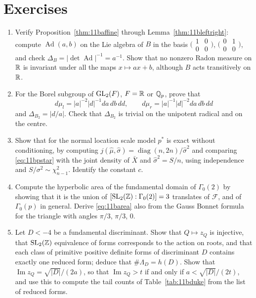 \section{Exercises}

\begin{enumerate}
\item Verify Proposition~\ref{thm:11baffine} through Lemma~\ref{thm:11bleftright}: compute $\operatorname{Ad}(a,b)$ on the Lie algebra of $B$ in the basis $\bigl(\begin{smallmatrix}1&0\\0&0\end{smallmatrix}\bigr)$, $\bigl(\begin{smallmatrix}0&1\\0&0\end{smallmatrix}\bigr)$, and check $\Delta_B=|\det\operatorname{Ad}|^{-1}=a^{-1}$. Show that no nonzero Radon measure on $\mathbb{R}$ is invariant under all the maps $x\mapsto ax+b$, although $B$ acts transitively on $\mathbb{R}$.
\item\label{ex:11bborel} For the Borel subgroup of $\mathrm{GL}_2(F)$, $F=\mathbb{R}$ or $\mathbb{Q}_p$, prove that
\[d\mu_l=|a|^{-2}|d|^{-1}da\,db\,dd,\qquad d\mu_r=|a|^{-1}|d|^{-2}da\,db\,dd\]
and $\Delta_{B_2}=|d/a|$. Check that $\Delta_{B_2}$ is trivial on the unipotent radical and on the centre.
\item Show that for the normal location scale model $p^*$ is exact without conditioning, by computing $j(\hat\mu,\hat\sigma)=\operatorname{diag}(n,2n)/\hat\sigma^2$ and comparing \eqref{eq:11bpstar} with the joint density of $\bar X$ and $\hat\sigma^2=S/n$, using independence and $S/\sigma^2\sim\chi^2_{n-1}$. Identify the constant $c$.
\item Compute the hyperbolic area of the fundamental domain of $\Gamma_0(2)$ by showing that it is the union of $[\mathrm{SL}_2(\mathbb{Z}):\Gamma_0(2)]=3$ translates of $\mathcal F$, and of $\Gamma_0(p)$ in general. Derive \eqref{eq:11barea} also from the Gauss Bonnet formula for the triangle with angles $\pi/3$, $\pi/3$, $0$.
\item\label{ex:11bclass} Let $D<-4$ be a fundamental discriminant. Show that $Q\mapsto z_Q$ is injective, that $\mathrm{SL}_2(\mathbb{Z})$ equivalence of forms corresponds to the action on roots, and that each class of primitive positive definite forms of discriminant $D$ contains exactly one reduced form; deduce that $\#\Lambda_D=h(D)$. Show that $\operatorname{Im}z_Q=\sqrt{|D|}/(2a)$, so that $\operatorname{Im}z_Q>t$ if and only if $a<\sqrt{|D|}/(2t)$, and use this to compute the tail counts of Table~\ref{tab:11bduke} from the list of reduced forms.

\end{enumerate}

